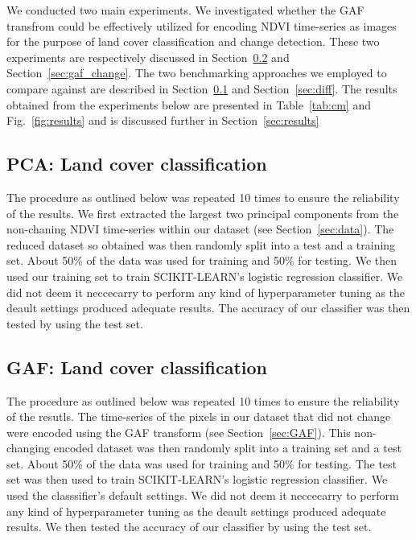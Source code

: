 \documentclass{article}
\begin{document}
We conducted two main experiments. We investigated whether the GAF transfrom could be effectively utilized for encoding NDVI time-series as images for the purpose of land cover classification and change detection. These two experiments are respectively discussed in Section~\ref{sec:gaf_class} and Section~\ref{sec:gaf_change}. The two benchmarking approaches we employed to compare against are described in Section~\ref{sec:pca} and Section~\ref{sec:diff}. The results obtained from the experiments below are presented in Table~\ref{tab:cm} and Fig.~\ref{fig:results} and is discussed further in Section~\ref{sec:results}        

\subsection{PCA: Land cover classification}
\label{sec:pca}
The procedure as outlined below was repeated 10 times to ensure the reliability of the results.  We first extracted the largest two principal components from the non-chaning NDVI time-series within our dataset (see Section~\ref{sec:data}). The reduced dataset so obtained was then randomly split into a test and a training set. About 50\% of the data was used for training and 50\% for testing. We then used our training set to train \textsc{SCIKIT-LEARN}'s logistic regression classifier. We did not deem it neccecarry to perform any kind of hyperparameter tuning as the deault settings produced adequate results. The accuracy of our classifier was then tested by using the test set. 

\subsection{GAF: Land cover classification}
\label{sec:gaf_class}
The procedure as outlined below was repeated 10 times to ensure the reliability of the resutls. The time-series of the pixels in our dataset that did not change were encoded using the GAF transform (see Section~\ref{sec:GAF}). This non-changing encoded dataset was then randomly split into a training set and a test set. About 50\% of the data was used for training and 50\% for testing. The test set was then used to train \textsc{SCIKIT-LEARN}'s logistic regression classifier. We used the classsifier's default settings. We did not deem it neccecarry to perform any kind of hyperparameter tuning as the deault settings produced adequate results. We then tested the accuracy of our classifier by using the test set. 
\end{document}
